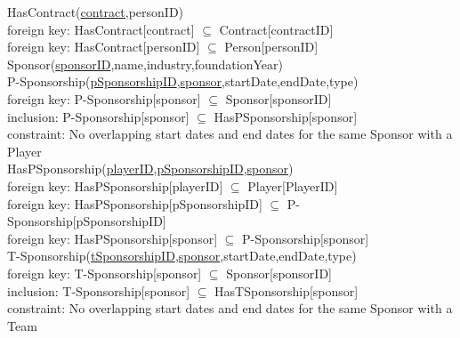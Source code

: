 {\color{ForestGreen}HasContract(\underline{contract},personID)}\\
{\color{Orange}\hspace{2mm} foreign key: {\color{Magenta}HasContract[contract] $\subseteq$ Contract[contractID]}} \\
{\color{Orange}\hspace{2mm} foreign key: {\color{Magenta}HasContract[personID] $\subseteq$ Person[personID]}} \\

{\color{ForestGreen}Sponsor(\underline{sponsorID},name,industry,foundationYear)}\\

{\color{ForestGreen}P-Sponsorship(\underline{pSponsorshipID},\underline{sponsor},startDate,endDate,type)}\\
{\color{Orange}\hspace{2mm} foreign key: {\color{Magenta}P-Sponsorship[sponsor] $\subseteq$ Sponsor[sponsorID]}} \\
{\color{Orange}\hspace{2mm} inclusion: {\color{Magenta}P-Sponsorship[sponsor] $\subseteq$ HasPSponsorship[sponsor]}} \\
{\color{Orange}\hspace{2mm} constraint: {\color{Magenta}No overlapping start dates and end dates for the same Sponsor with a Player}} \\

{\color{ForestGreen}HasPSponsorship(\underline{playerID},\underline{pSponsorshipID},\underline{sponsor})}\\
{\color{Orange}\hspace{2mm} foreign key: {\color{Magenta}HasPSponsorship[playerID] $\subseteq$ Player[PlayerID]}} \\
{\color{Orange}\hspace{2mm} foreign key: {\color{Magenta}HasPSponsorship[pSponsorshipID] $\subseteq$ P-Sponsorship[pSponsorshipID]}} \\
{\color{Orange}\hspace{2mm} foreign key: {\color{Magenta}HasPSponsorship[sponsor] $\subseteq$ P-Sponsorship[sponsor]}} \\

{\color{ForestGreen}T-Sponsorship(\underline{tSponsorshipID},\underline{sponsor},startDate,endDate,type)}\\
{\color{Orange}\hspace{2mm} foreign key: {\color{Magenta}T-Sponsorship[sponsor] $\subseteq$ Sponsor[sponsorID]}} \\
{\color{Orange}\hspace{2mm} inclusion: {\color{Magenta}T-Sponsorship[sponsor] $\subseteq$ HasTSponsorship[sponsor]}} \\
{\color{Orange}\hspace{2mm} constraint: {\color{Magenta}No overlapping start dates and end dates for the same Sponsor with a Team}} \\

